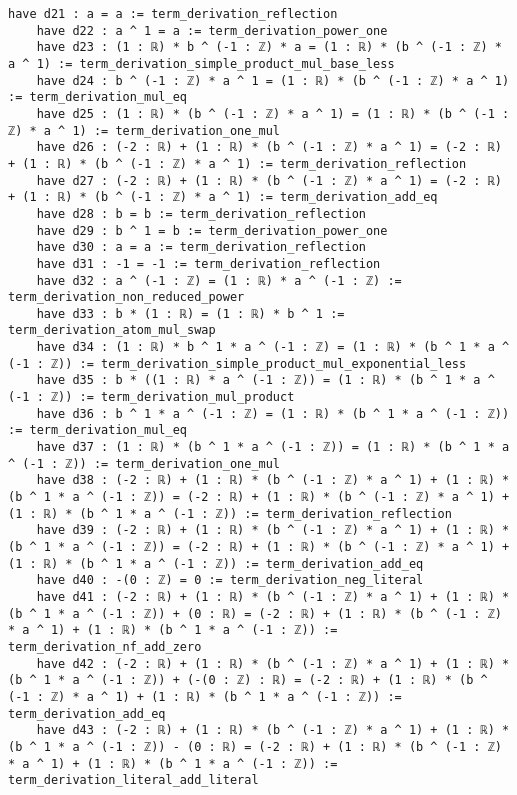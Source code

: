 \documentclass{article}
\begin{document}
\begin{tcolorbox}[colback=white!10, width=\linewidth]
\begin{lstlisting}[language=Lean4]
    have d21 : a = a := term_derivation_reflection
    have d22 : a ^ 1 = a := term_derivation_power_one
    have d23 : (1 : ℝ) * b ^ (-1 : ℤ) * a = (1 : ℝ) * (b ^ (-1 : ℤ) * a ^ 1) := term_derivation_simple_product_mul_base_less
    have d24 : b ^ (-1 : ℤ) * a ^ 1 = (1 : ℝ) * (b ^ (-1 : ℤ) * a ^ 1) := term_derivation_mul_eq
    have d25 : (1 : ℝ) * (b ^ (-1 : ℤ) * a ^ 1) = (1 : ℝ) * (b ^ (-1 : ℤ) * a ^ 1) := term_derivation_one_mul
    have d26 : (-2 : ℝ) + (1 : ℝ) * (b ^ (-1 : ℤ) * a ^ 1) = (-2 : ℝ) + (1 : ℝ) * (b ^ (-1 : ℤ) * a ^ 1) := term_derivation_reflection
    have d27 : (-2 : ℝ) + (1 : ℝ) * (b ^ (-1 : ℤ) * a ^ 1) = (-2 : ℝ) + (1 : ℝ) * (b ^ (-1 : ℤ) * a ^ 1) := term_derivation_add_eq
    have d28 : b = b := term_derivation_reflection
    have d29 : b ^ 1 = b := term_derivation_power_one
    have d30 : a = a := term_derivation_reflection
    have d31 : -1 = -1 := term_derivation_reflection
    have d32 : a ^ (-1 : ℤ) = (1 : ℝ) * a ^ (-1 : ℤ) := term_derivation_non_reduced_power
    have d33 : b * (1 : ℝ) = (1 : ℝ) * b ^ 1 := term_derivation_atom_mul_swap
    have d34 : (1 : ℝ) * b ^ 1 * a ^ (-1 : ℤ) = (1 : ℝ) * (b ^ 1 * a ^ (-1 : ℤ)) := term_derivation_simple_product_mul_exponential_less
    have d35 : b * ((1 : ℝ) * a ^ (-1 : ℤ)) = (1 : ℝ) * (b ^ 1 * a ^ (-1 : ℤ)) := term_derivation_mul_product
    have d36 : b ^ 1 * a ^ (-1 : ℤ) = (1 : ℝ) * (b ^ 1 * a ^ (-1 : ℤ)) := term_derivation_mul_eq
    have d37 : (1 : ℝ) * (b ^ 1 * a ^ (-1 : ℤ)) = (1 : ℝ) * (b ^ 1 * a ^ (-1 : ℤ)) := term_derivation_one_mul
    have d38 : (-2 : ℝ) + (1 : ℝ) * (b ^ (-1 : ℤ) * a ^ 1) + (1 : ℝ) * (b ^ 1 * a ^ (-1 : ℤ)) = (-2 : ℝ) + (1 : ℝ) * (b ^ (-1 : ℤ) * a ^ 1) + (1 : ℝ) * (b ^ 1 * a ^ (-1 : ℤ)) := term_derivation_reflection
    have d39 : (-2 : ℝ) + (1 : ℝ) * (b ^ (-1 : ℤ) * a ^ 1) + (1 : ℝ) * (b ^ 1 * a ^ (-1 : ℤ)) = (-2 : ℝ) + (1 : ℝ) * (b ^ (-1 : ℤ) * a ^ 1) + (1 : ℝ) * (b ^ 1 * a ^ (-1 : ℤ)) := term_derivation_add_eq
    have d40 : -(0 : ℤ) = 0 := term_derivation_neg_literal
    have d41 : (-2 : ℝ) + (1 : ℝ) * (b ^ (-1 : ℤ) * a ^ 1) + (1 : ℝ) * (b ^ 1 * a ^ (-1 : ℤ)) + (0 : ℝ) = (-2 : ℝ) + (1 : ℝ) * (b ^ (-1 : ℤ) * a ^ 1) + (1 : ℝ) * (b ^ 1 * a ^ (-1 : ℤ)) := term_derivation_nf_add_zero
    have d42 : (-2 : ℝ) + (1 : ℝ) * (b ^ (-1 : ℤ) * a ^ 1) + (1 : ℝ) * (b ^ 1 * a ^ (-1 : ℤ)) + (-(0 : ℤ) : ℝ) = (-2 : ℝ) + (1 : ℝ) * (b ^ (-1 : ℤ) * a ^ 1) + (1 : ℝ) * (b ^ 1 * a ^ (-1 : ℤ)) := term_derivation_add_eq
    have d43 : (-2 : ℝ) + (1 : ℝ) * (b ^ (-1 : ℤ) * a ^ 1) + (1 : ℝ) * (b ^ 1 * a ^ (-1 : ℤ)) - (0 : ℝ) = (-2 : ℝ) + (1 : ℝ) * (b ^ (-1 : ℤ) * a ^ 1) + (1 : ℝ) * (b ^ 1 * a ^ (-1 : ℤ)) := term_derivation_literal_add_literal

\end{lstlisting}
\end{tcolorbox}
\end{document}
